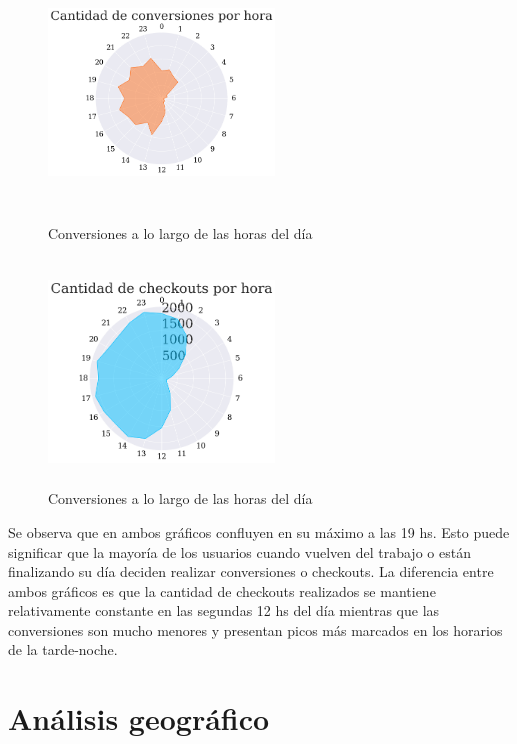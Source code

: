 \documentclass[a4paper]{article}
\begin{document}
\begin{figure}[h!]
	\centering
	\begin{minipage}[b]{0.4\textwidth}
		\includegraphics[width=6cm,height=6cm,keepaspectratio]{figures/040-hours-conversion-radarchart.png}
		\caption{Conversiones a lo largo de las horas del día}
	\end{minipage}
	\hfill
	\begin{minipage}[b]{0.4\textwidth}
		\includegraphics[width=6cm,height=6cm,keepaspectratio]{figures/041-hours-checkout-radarchart.png}
		\caption{Conversiones a lo largo de las horas del día}
	\end{minipage}
\end{figure}

Se observa que en ambos gráficos confluyen en su máximo a las 19 hs. Esto puede significar que la mayoría de los usuarios cuando vuelven del trabajo o están finalizando su día deciden realizar conversiones o checkouts. La diferencia entre ambos gráficos es que la cantidad de checkouts realizados se mantiene relativamente constante en las segundas 12 hs del día mientras que las conversiones son mucho menores y presentan picos más marcados en los horarios de la tarde-noche. 

\section{Análisis geográfico}
\end{document}
